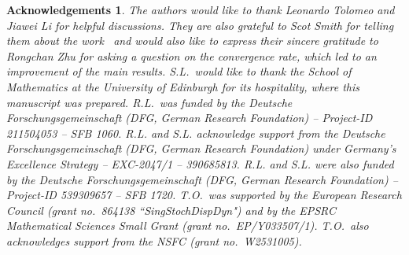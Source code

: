 \documentclass[letterpaper, 11pt,  reqno]{amsart}
\newcommand{\1}{\hspace{0.5mm}\text{I}\hspace{0.2mm}}
\newtheorem*{ackno}{Acknowledgements}
\numberwithin{equation}{section}
\numberwithin{theorem}{section}
\begin{document}
\begin{ackno} \rm
The authors would like to thank Leonardo Tolomeo and Jiawei Li for helpful discussions. 
They are also grateful to Scot Smith
for telling them about the work~\cite{DS}
and 
 would also like to express their sincere gratitude
to Rongchan Zhu for asking a question on the convergence rate,
which led to an improvement 
of the main results.
S.L.~would like to thank the School of Mathematics at the University of Edinburgh for its hospitality, where this
manuscript was prepared.
R.L.~was funded by the Deutsche Forschungsgemeinschaft (DFG, German Research Foundation) -- Project-ID
211504053 -- SFB 1060.
R.L. and S.L. acknowledge support from the Deutsche Forschungsgemeinschaft (DFG, German Research Foundation) under Germany's Excellence Strategy -- EXC-2047/1 -- 390685813.
R.L. and S.L. were also funded by the Deutsche Forschungsgemeinschaft (DFG, German Research 
Foundation) -- Project-ID 539309657 -- SFB 1720.
T.O.~was supported by the European Research Council (grant no.~864138 ``SingStochDispDyn")
and  by the EPSRC 
Mathematical Sciences
Small Grant (grant no.~EP/Y033507/1).
T.O.~also
acknowledges support from  
the NSFC (grant no.~W2531005).


    
\end{ackno}
\end{document}
